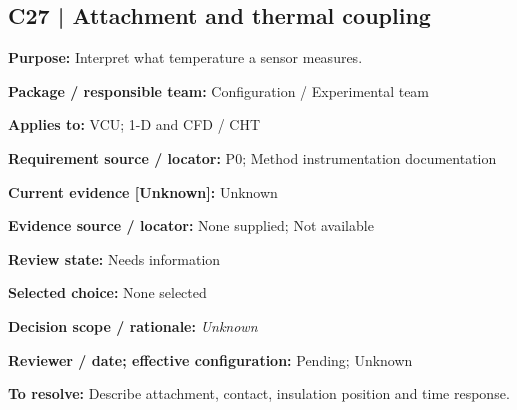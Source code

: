 \documentclass[11pt]{article}
\begin{document}
\par\noindent\begin{minipage}{\textwidth}\small\setlength{\parskip}{2pt}
\subsection*{C27 | Attachment and thermal coupling}
\textbf{Purpose:} Interpret what temperature a sensor measures.\par
\textbf{Package / responsible team:} Configuration / Experimental team\par
\textbf{Applies to:} VCU; 1-D and CFD / CHT\par
\textbf{Requirement source / locator:} P0; Method instrumentation documentation\par
\textbf{Current evidence [Unknown]:} Unknown\par
\textbf{Evidence source / locator:} None supplied; Not available\par
\textbf{Review state:} Needs information\par
\textbf{Selected choice:} None selected\par
\textbf{Decision scope / rationale:} \textit{Unknown}\par
\textbf{Reviewer / date; effective configuration:} Pending; Unknown\par
\textbf{To resolve:} Describe attachment, contact, insulation position and time response.\par
\end{minipage}\par\vspace{5pt}
\end{document}
